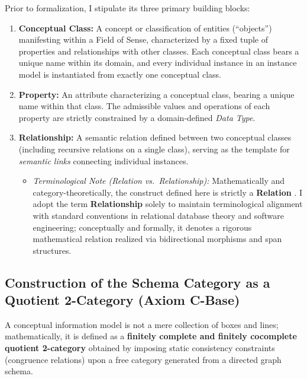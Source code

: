 \documentclass[11pt,a4paper]{article}
\theoremstyle{definition}
\theoremstyle{plain}
\theoremstyle{remark}
\begin{document}
Prior to formalization, I stipulate its three primary building blocks:
\begin{enumerate}
    \item \textbf{Conceptual Class:} A concept or classification of entities (``objects'') manifesting within a Field of Sense, characterized by a fixed tuple of properties and relationships with other classes. Each conceptual class bears a unique name within its domain, and every individual instance in an instance model is instantiated from exactly one conceptual class.
    \item \textbf{Property:} An attribute characterizing a conceptual class, bearing a unique name within that class. The admissible values and operations of each property are strictly constrained by a domain-defined \emph{Data Type}.
    \item \textbf{Relationship:} A semantic relation defined between two conceptual classes (including recursive relations on a single class), serving as the template for \emph{semantic links} connecting individual instances.
    \begin{itemize}
        \item \emph{Terminological Note (Relation vs.\ Relationship):} Mathematically and category-theoretically, the construct defined here is strictly a \textbf{Relation} \cite{codd1970}. I adopt the term \textbf{Relationship} solely to maintain terminological alignment with standard conventions in relational database theory and software engineering; conceptually and formally, it denotes a rigorous mathematical relation realized via bidirectional morphisms and span structures.
    \end{itemize}
\end{enumerate}

\subsection{Construction of the Schema Category as a Quotient 2-Category (Axiom C-Base)}
A conceptual information model is not a mere collection of boxes and lines; mathematically, it is defined as a \textbf{finitely complete and finitely cocomplete quotient 2-category} obtained by imposing static consistency constraints (congruence relations) upon a free category generated from a directed graph schema.
\end{document}
